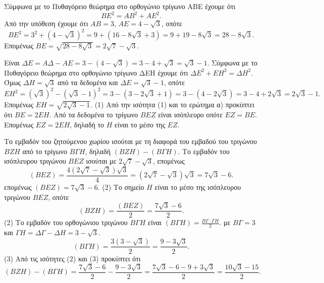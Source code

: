 \begin{alist}
    \item Σύμφωνα με το Πυθαγόρειο θεώρημα στο ορθογώνιο τρίγωνο ΑΒΕ έχουμε ότι
    \[ ΒΕ^2 = ΑΒ^2 + ΑΕ^2. \]
    Από την υπόθεση έχουμε ότι $ΑΒ = 3$, $ΑΕ = 4 - \sqrt{3}$, οπότε
    \[ ΒΕ^2 = 3^2 + (4 - \sqrt{3})^2 = 9 + (16 - 8\sqrt{3} + 3) = 9 + 19 - 8\sqrt{3} = 28 - 8\sqrt{3}. \]
    Επομένως $ΒΕ = \sqrt{28 - 8\sqrt{3}} = 2\sqrt{7} - \sqrt{3}$. 

    \item Είναι $ΔΕ = ΑΔ - ΑΕ = 3 - (4 - \sqrt{3}) = 3 - 4 + \sqrt{3} = \sqrt{3} - 1$.
    Σύμφωνα με το Πυθαγόρειο θεώρημα στο ορθογώνιο τρίγωνο ΔΕΗ έχουμε ότι
    $ΔΕ^2 + ΕΗ^2 = ΔΗ^2$. Όμως $ΔΗ = \sqrt{3}$ από τα δεδομένα και $ΔΕ = \sqrt{3} - 1$, οπότε
    \[ ΕΗ^2 = (\sqrt{3})^2 - (\sqrt{3} - 1)^2 = 3 - (3 - 2\sqrt{3} + 1) = 3 - (4 - 2\sqrt{3}) = 3 - 4 + 2\sqrt{3} = 2\sqrt{3} - 1. \]
    Επομένως $ΕΗ = \sqrt{2\sqrt{3} - 1}$. (1)
    Από την ισότητα (1) και το ερώτημα α) προκύπτει ότι $ΒΕ = 2ΕΗ$. Από τα δεδομένα το τρίγωνο $ΒΕΖ$ είναι ισόπλευρο οπότε $ΕΖ = ΒΕ$. Επομένως $ΕΖ = 2ΕΗ$, δηλαδή το $Η$ είναι το μέσο της $ΕΖ$. 

    \item Το εμβαδόν του ζητούμενου χωρίου ισούται με τη διαφορά του εμβαδού του τριγώνου $BZH$ από το τρίγωνο $B\Gamma H$, δηλαδή $(BZH) - (B\Gamma H)$.
    Το εμβαδόν του ισόπλευρου τριγώνου $ΒΕΖ$ ισούται με $2\sqrt{7} - \sqrt{3}$, επομένως
    \[ (BEZ) = \frac{4(2\sqrt{7}-\sqrt{3})\sqrt{3}}{4} = (2\sqrt{7}-\sqrt{3})\sqrt{3} = 7\sqrt{3}-6. \]
    επομένως $(BEZ) = 7\sqrt{3}-6$. (2)
    Το σημείο $Η$ είναι το μέσο της ισόπλευρου τριγώνου $ΒΕΖ$, οπότε
    \[ (BZH) = \frac{(BEZ)}{2} = \frac{7\sqrt{3}-6}{2}. \] (2)
    Το εμβαδόν του ορθογώνιου τριγώνου $B\Gamma H$ είναι $(B\Gamma H) = \frac{B\Gamma \cdot \Gamma H}{2}$.
    με $B\Gamma = 3$ και $ΓH = \Delta \Gamma - \Delta H = 3 - \sqrt{3}$.
    \[ (B\Gamma H) = \frac{3(3-\sqrt{3})}{2} = \frac{9-3\sqrt{3}}{2}. \] (3)
    Από τις ισότητες (2) και (3) προκύπτει ότι
    \[ (BZH) - (B\Gamma H) = \frac{7\sqrt{3}-6}{2} - \frac{9-3\sqrt{3}}{2} = \frac{7\sqrt{3}-6-9+3\sqrt{3}}{2} = \frac{10\sqrt{3}-15}{2}. \]
\end{alist}